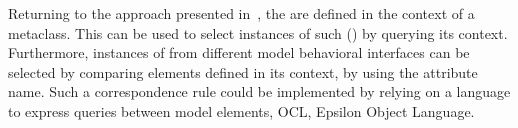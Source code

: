 Returning to the approach presented in~\cite{sle13-combemale}, the \dse are defined in the context of a metaclass. This can be used to select instances of such \dse (\mse) by querying its context. Furthermore, instances of \dse from different model behavioral interfaces can be selected by comparing elements defined in its context, \ie by using the attribute name. Such a correspondence rule could be implemented by relying on a language to express queries between model elements, \eg OCL, Epsilon Object Language.

			
			
						 
							
						
				
